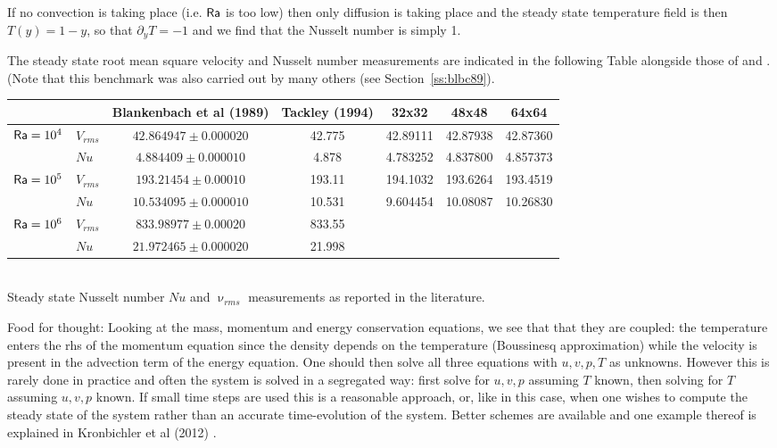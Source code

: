 If no convection is taking place (i.e. ${\mathsf{Ra}}$ is too low) then only diffusion is taking place 
and the steady state temperature field is then $T(y)=1-y$, so that $\partial_y T=-1$ and 
we find that the Nusselt number is simply 1.

The steady state root mean square velocity and Nusselt number measurements
are indicated in the following Table alongside those of \cite{blbc89} and \cite{tack94}.
(Note that this benchmark was also carried out by many others (see Section~\ref{ss:blbc89}).

\begin{center}
\begin{tabular}{llccccc}
\hline
          &           & Blankenbach et al (1989) & Tackley (1994)  & 32x32 & 48x48 & 64x64  \\
\hline
\hline
${\mathsf{Ra}}=10^4$ & $V_{rms}$ &  $42.864947  \pm 0.000020$ & 42.775 & 42.89111& 42.87938& 42.87360\\  
          & $Nu$      &  $4.884409   \pm 0.000010$ & 4.878  & 4.783252 & 4.837800& 4.857373\\
${\mathsf{Ra}}=10^5$ & $V_{rms}$ &  $193.21454  \pm 0.00010 $ & 193.11 & 194.1032 & 193.6264 &  193.4519  \\ 
          & $Nu$      &  $10.534095  \pm 0.000010$ & 10.531 & 9.604454& 10.08087 &  10.26830  \\
${\mathsf{Ra}}=10^6$ & $V_{rms}$ &  $833.98977  \pm 0.00020 $ & 833.55 & & & \\
          & $Nu$      &  $21.972465  \pm 0.000020$ & 21.998 & & & \\
\hline
\end{tabular}\\
{\small Steady state Nusselt number $Nu$ and $\upnu_{rms}$ measurements as reported in the literature. }
\end{center}

Food for thought: Looking at the mass, momentum and energy conservation equations, 
we see that that they are coupled: the temperature enters the rhs of the momentum 
equation since the density depends on the temperature (Boussinesq approximation)
while the velocity is present in the advection term of the energy equation.
One should then solve all three equations with $u,v,p,T$ as unknowns. However
this is rarely done in practice and often the system is solved in a segregated way:
first solve for $u,v,p$ assuming $T$ known, then solving for $T$ assuming $u,v,p$ known.
If small time steps are used this is a reasonable approach, or, like in this case, when 
one wishes to compute the steady state of the system rather than an accurate time-evolution
of the system. Better schemes are available and one example thereof is explained in Kronbichler et al (2012) 
\cite{krhb12}.

